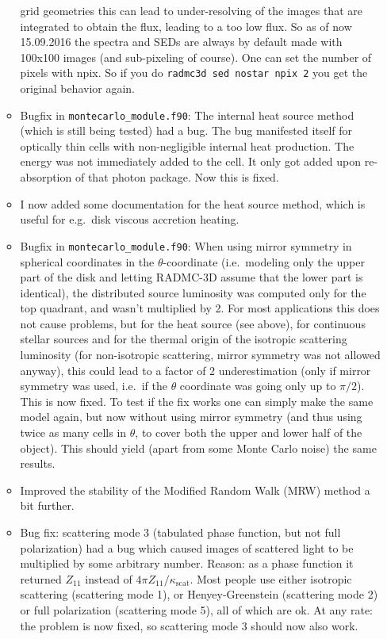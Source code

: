 \documentclass{report}
\begin{document}
\begin{itemize}
\begin{itemize}
    grid geometries this can lead to under-resolving of the images that are
    integrated to obtain the flux, leading to a too low flux.  So as of now
    15.09.2016 the spectra and SEDs are always by default made with 100x100
    images (and sub-pixeling of course). One can set the number of pixels
    with npix. So if you do {\small\tt radmc3d sed nostar npix 2} you get
    the original behavior again. 
  \item Bugfix in {\small\tt montecarlo\_module.f90}:
    The internal heat source method (which is still being tested)
    had a bug. The bug manifested itself for optically thin cells with
    non-negligible internal heat production. The energy was not immediately
    added to the cell. It only got added upon re-absorption of that photon
    package. Now this is fixed.
  \item I now added some documentation for the heat source method, which
    is useful for e.g.\ disk viscous accretion heating.
  \item Bugfix in {\small\tt montecarlo\_module.f90}: When using mirror
    symmetry in spherical coordinates in the $\theta$-coordinate
    (i.e.~modeling only the upper part of the disk and letting RADMC-3D
    assume that the lower part is identical), the distributed source
    luminosity was computed only for the top quadrant, and wasn't multiplied
    by 2. For most applications this does not cause problems, but for the
    heat source (see above), for continuous stellar sources and for the
    thermal origin of the isotropic scattering luminosity (for non-isotropic
    scattering, mirror symmetry was not allowed anyway), this could lead to
    a factor of 2 underestimation (only if mirror symmetry was used, i.e.\
    if the $\theta$ coordinate was going only up to $\pi/2$). This is now
    fixed. To test if the fix works one can simply make the same model
    again, but now without using mirror symmetry (and thus using twice as
    many cells in $\theta$, to cover both the upper and lower half of the
    object). This should yield (apart from some Monte Carlo noise) the same
    results.
  \item Improved the stability of the Modified Random Walk (MRW) method
    a bit further. 
  \item Bug fix: scattering mode 3 (tabulated phase function, but not full
    polarization) had a bug which caused images of scattered light to be
    multiplied by some arbitrary number. Reason: as a phase function it
    returned $Z_{11}$ instead of $4\pi Z_{11}/\kappa_{\mathrm{scat}}$. Most
    people use either isotropic scattering (scattering mode 1), or
    Henyey-Greenstein (scattering mode 2) or full polarization (scattering
    mode 5), all of which are ok. At any rate: the problem is now fixed,
    so scattering mode 3 should now also work.
  \end{itemize}
\end{itemize}
\end{document}
